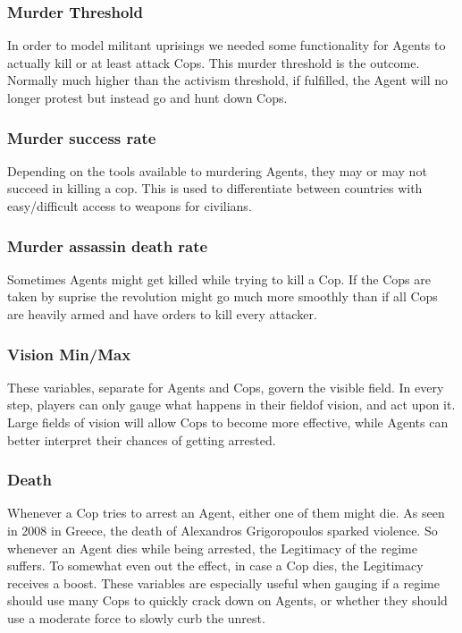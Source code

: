 \documentclass[11pt]{article}
\begin{document}
\subsubsection{Murder Threshold}
In order to model militant uprisings we needed some functionality for Agents to actually kill or at least attack Cops. This murder threshold is the outcome. Normally much higher than the activism threshold, if fulfilled, the Agent will no longer protest but instead go and hunt down Cops.

\subsubsection{Murder success rate}
Depending on the tools available to murdering Agents, they may or may not succeed in killing a cop. This is used to differentiate between countries with easy/difficult access to weapons for civilians.

\subsubsection{Murder assassin death rate}
Sometimes Agents might get killed while trying to kill a Cop. If the Cops are taken by suprise the revolution might go much more smoothly than if all Cops are heavily armed and have orders to kill every attacker.

\subsubsection{Vision Min/Max}
These variables, separate for Agents and Cops, govern the visible field. In every step, players can only gauge what happens in their fieldof vision, and act upon it. Large fields of vision will allow Cops to become more effective, while Agents can better interpret their chances of getting arrested.

\subsubsection{Death}
Whenever a Cop tries to arrest an Agent, either one of them might die. As seen in 2008 in Greece, the death of Alexandros Grigoropoulos sparked violence. So whenever an Agent dies while being arrested, the Legitimacy of the regime suffers. To somewhat even out the effect, in case a Cop dies, the Legitimacy receives a boost. These variables are especially useful when gauging if a regime should use many Cops to quickly crack down on Agents, or whether they should use a moderate force to slowly curb the unrest.
\end{document}
